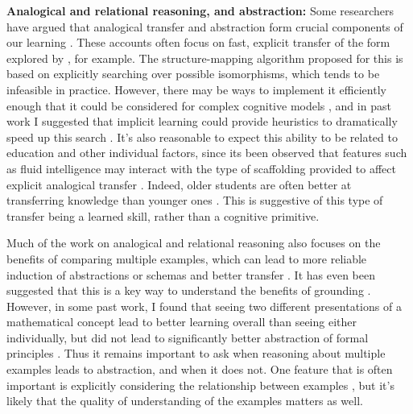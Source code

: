 \textbf{Analogical and relational reasoning, and abstraction:} Some researchers have argued that analogical transfer and abstraction form crucial components of our learning \citep[e.g.][]{Gentner2003, Lakoff1980, Gentner2017}. These accounts often focus on fast, explicit transfer of the form explored by \citet{Gick1980}, for example. The structure-mapping algorithm \citep{Falkenhainer1989} proposed for this is based on explicitly searching over possible isomorphisms, which tends to be infeasible in practice. However, there may be ways to implement it efficiently enough that it could be considered for complex cognitive models \citep{Forbus2017}, and in past work I suggested that implicit learning could provide heuristics to dramatically speed up this search \citep{Lampinen2017a}. It's also reasonable to expect this ability to be related to education and other individual factors, since its been observed that features such as fluid intelligence may interact with the type of scaffolding provided to affect explicit analogical transfer \citep{Kubricht2017}. Indeed, older students are often better at transferring knowledge than younger ones \citep[e.g.][]{Chen1999}. This is suggestive of this type of transfer being a learned skill, rather than a cognitive primitive. \par
Much of the work on analogical and relational reasoning also focuses on the benefits of comparing multiple examples, which can lead to more reliable induction of abstractions or schemas and better transfer \citep{Gick1980, Gentner2017}. It has even been suggested that this is a key way to understand the benefits of grounding \citep{Jamrozik2016}. However, in some past work, I found that seeing two different presentations of a mathematical concept lead to better learning overall than seeing either individually, but did not lead to significantly better abstraction of formal principles \citep{Lampinen2017b}. Thus it remains important to ask when reasoning about multiple examples leads to abstraction, and when it does not. One feature that is often important is explicitly considering the relationship between examples \citep{Gentner2017}, but it's likely that the quality of understanding of the examples matters as well. \par 
